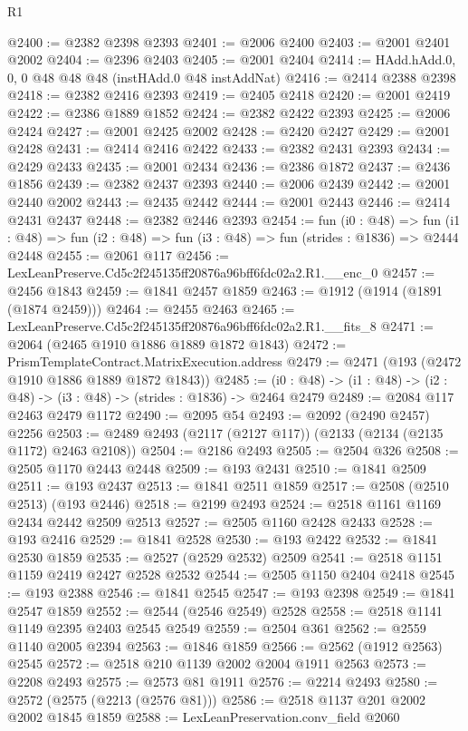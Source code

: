 \begin{lexlean}{R1}
\begin{coremodule}
@2400 := @2382 @2398 @2393
@2401 := @2006 @2400
@2403 := @2001 @2401 @2002
@2404 := @2396 @2403
@2405 := @2001 @2404
@2414 := HAdd.hAdd.{0, 0, 0} @48 @48 @48 (instHAdd.{0} @48 instAddNat)
@2416 := @2414 @2388 @2398
@2418 := @2382 @2416 @2393
@2419 := @2405 @2418
@2420 := @2001 @2419
@2422 := @2386 @1889 @1852
@2424 := @2382 @2422 @2393
@2425 := @2006 @2424
@2427 := @2001 @2425 @2002
@2428 := @2420 @2427
@2429 := @2001 @2428
@2431 := @2414 @2416 @2422
@2433 := @2382 @2431 @2393
@2434 := @2429 @2433
@2435 := @2001 @2434
@2436 := @2386 @1872
@2437 := @2436 @1856
@2439 := @2382 @2437 @2393
@2440 := @2006 @2439
@2442 := @2001 @2440 @2002
@2443 := @2435 @2442
@2444 := @2001 @2443
@2446 := @2414 @2431 @2437
@2448 := @2382 @2446 @2393
@2454 := fun (i0 : @48) =>
  fun (i1 : @48) => fun (i2 : @48) => fun (i3 : @48) => fun (strides : @1836) => @2444 @2448
@2455 := @2061 @117
@2456 := LexLeanPreserve.Cd5c2f245135ff20876a96bff6fdc02a2.R1.__enc_0
@2457 := @2456 @1843
@2459 := @1841 @2457 @1859
@2463 := @1912 (@1914 (@1891 (@1874 @2459)))
@2464 := @2455 @2463
@2465 := LexLeanPreserve.Cd5c2f245135ff20876a96bff6fdc02a2.R1.__fits_8
@2471 := @2064 (@2465 @1910 @1886 @1889 @1872 @1843)
@2472 := PrismTemplateContract.MatrixExecution.address
@2479 := @2471 (@193 (@2472 @1910 @1886 @1889 @1872 @1843))
@2485 := (i0 : @48) -> (i1 : @48) -> (i2 : @48) -> (i3 : @48) -> (strides : @1836) -> @2464 @2479
@2489 := @2084 @117 @2463 @2479 @1172
@2490 := @2095 @54
@2493 := @2092 (@2490 @2457) @2256
@2503 := @2489 @2493 (@2117 (@2127 @117)) (@2133 (@2134 (@2135 @1172) @2463 @2108))
@2504 := @2186 @2493
@2505 := @2504 @326
@2508 := @2505 @1170 @2443 @2448
@2509 := @193 @2431
@2510 := @1841 @2509
@2511 := @193 @2437
@2513 := @1841 @2511 @1859
@2517 := @2508 (@2510 @2513) (@193 @2446)
@2518 := @2199 @2493
@2524 := @2518 @1161 @1169 @2434 @2442 @2509 @2513
@2527 := @2505 @1160 @2428 @2433
@2528 := @193 @2416
@2529 := @1841 @2528
@2530 := @193 @2422
@2532 := @1841 @2530 @1859
@2535 := @2527 (@2529 @2532) @2509
@2541 := @2518 @1151 @1159 @2419 @2427 @2528 @2532
@2544 := @2505 @1150 @2404 @2418
@2545 := @193 @2388
@2546 := @1841 @2545
@2547 := @193 @2398
@2549 := @1841 @2547 @1859
@2552 := @2544 (@2546 @2549) @2528
@2558 := @2518 @1141 @1149 @2395 @2403 @2545 @2549
@2559 := @2504 @361
@2562 := @2559 @1140 @2005 @2394
@2563 := @1846 @1859
@2566 := @2562 (@1912 @2563) @2545
@2572 := @2518 @210 @1139 @2002 @2004 @1911 @2563
@2573 := @2208 @2493
@2575 := @2573 @81 @1911
@2576 := @2214 @2493
@2580 := @2572 (@2575 (@2213 (@2576 @81)))
@2586 := @2518 @1137 @201 @2002 @2002 @1845 @1859
@2588 := LexLeanPreservation.conv_field @2060

\end{coremodule}
\end{lexlean}
